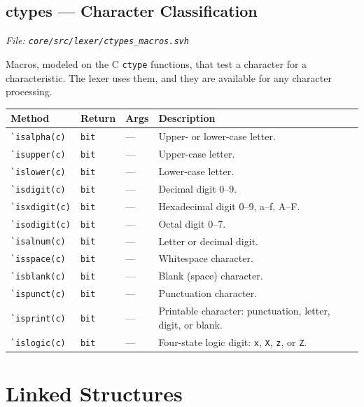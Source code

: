 \documentclass[11pt,letterpaper]{report}
\begin{document}
\section{ctypes --- Character Classification}
\noindent\small\textit{File: \texttt{core/src/lexer/ctypes\_macros.svh}}\par

Macros, modeled on the C \texttt{ctype} functions, that test a character for a characteristic. The lexer uses them, and they are available for any character processing.

\begin{xltabular}{\linewidth}{>{\small}p{1.35in} >{\small}p{1.25in} >{\small}p{0.95in} >{\small}X}
\toprule
\textbf{Method} & \textbf{Return} & \textbf{Args} & \textbf{Description} \\
\midrule
\endhead
\bottomrule
\endfoot
\texttt{\`{}isalpha(c)} & \texttt{bit} & --- & Upper- or lower-case letter. \\
\texttt{\`{}isupper(c)} & \texttt{bit} & --- & Upper-case letter. \\
\texttt{\`{}islower(c)} & \texttt{bit} & --- & Lower-case letter. \\
\texttt{\`{}isdigit(c)} & \texttt{bit} & --- & Decimal digit 0--9. \\
\texttt{\`{}isxdigit(c)} & \texttt{bit} & --- & Hexadecimal digit 0--9, a--f, A--F. \\
\texttt{\`{}isodigit(c)} & \texttt{bit} & --- & Octal digit 0--7. \\
\texttt{\`{}isalnum(c)} & \texttt{bit} & --- & Letter or decimal digit. \\
\texttt{\`{}isspace(c)} & \texttt{bit} & --- & Whitespace character. \\
\texttt{\`{}isblank(c)} & \texttt{bit} & --- & Blank (space) character. \\
\texttt{\`{}ispunct(c)} & \texttt{bit} & --- & Punctuation character. \\
\texttt{\`{}isprint(c)} & \texttt{bit} & --- & Printable character: punctuation, letter, digit, or blank. \\
\texttt{\`{}islogic(c)} & \texttt{bit} & --- & Four-state logic digit: \texttt{x}, \texttt{X}, \texttt{z}, or \texttt{Z}. \\
\end{xltabular}

\chapter{Linked Structures}
\end{document}
